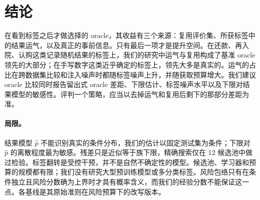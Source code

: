 \documentclass[runningheads]{llncs}
\begin{document}
\section{结论}
\label{sec:conclusion}
在看到标签之后才做选择的 oracle，其收益有三个来源：复用评价集、所获标签中的结果运气，以及真正的事前信息。只有最后一项才是提升空间。在还款、再入院、认购这类记录随机结果的标签上，我们的研究中运气与复用构成了基准 oracle 领先的大部分；在手写数字这类近乎确定的标签上，领先大多是真实的。运气的占比在跨数据集比较和注入噪声时都随标签噪声上升，并随获取预算增大。我们建议 oracle 比较同时报告留出式 oracle 差距、下限估计、标签噪声水平以及下限对结果模型的敏感性。评判一个策略，应当以去掉运气和复用后剩下的那部分差距为准。

\paragraph{局限。}结果模型 $\hat p$ 不能识别真实的条件分布，我们的估计以固定测试集为条件；下限对 $\hat p$ 的离散程度最为敏感。残差只是近似等于族下限，精确搜索仅在 12 候选池中做过检验。标签翻转是受控干预，并不是自然不确定性的模型。候选池、学习器和预算的规模都有限；我们没有研究大型预训练模型或多分类标签。风险包络只有在条件独立且风险分数确为上界时才具有概率含义，而我们的经验分数不能保证这一点。各基线是其原始准则在风险预算下的改写版本。



\end{document}
